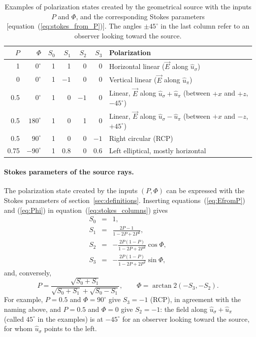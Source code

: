 \documentclass{iucr}
\begin{document}
\begin{table}
\centering
\caption{Examples of polarization states created by the geometrical source with the inputs $P$ and $\Phi$, and the corresponding Stokes parameters [equation~(\ref{eq:stokes_from_P})]. The angles $\pm45^\circ$ in the last column refer to an observer looking toward the source.}
\label{tab:source_polarization}
\small
\begin{tabular}{rr rrrr p{3.4cm}}
\hline
$P$ & $\Phi$ & $S_0$ & $S_1$ & $S_2$ & $S_3$ & Polarization \\
\hline
1    & $0^\circ$    & 1 & 1    & 0  & 0    & Horizontal linear ($\vec{E}$ along $\hat{u}_\sigma$) \\
0    & $0^\circ$    & 1 & $-1$ & 0  & 0    & Vertical linear ($\vec{E}$ along $\hat{u}_\pi$) \\
0.5  & $0^\circ$    & 1 & 0    & $-1$ & 0  & Linear, $\vec{E}$ along $\hat{u}_\sigma+\hat{u}_\pi$ (between $+x$ and $+z$, $-45^\circ$) \\
0.5  & $180^\circ$  & 1 & 0    & 1  & 0    & Linear, $\vec{E}$ along $\hat{u}_\sigma-\hat{u}_\pi$ (between $+x$ and $-z$, $+45^\circ$) \\
0.5  & $90^\circ$   & 1 & 0    & 0  & $-1$ & Right circular (RCP) \\
0.75 & $-90^\circ$  & 1 & 0.8  & 0  & 0.6  & Left elliptical, mostly horizontal \\
\hline
\end{tabular}
\end{table}

\paragraph{Stokes parameters of the source rays.}
The polarization state created by the inputs $(P,\Phi)$ can be expressed with the Stokes parameters of section~\ref{sec:definitions}. Inserting equations~(\ref{eq:EfromP}) and (\ref{eq:Phi}) in equation~(\ref{eq:stokes_columns}) gives
\begin{eqnarray}\label{eq:stokes_from_P}
    S_0 &=& 1, \nonumber \\
    S_1 &=& \frac{2P-1}{1-2P+2P^2}, \nonumber \\
    S_2 &=& -\frac{2P(1-P)}{1-2P+2P^2}\cos\Phi, \nonumber \\
    S_3 &=& -\frac{2P(1-P)}{1-2P+2P^2}\sin\Phi,
\end{eqnarray}
and, conversely,
\begin{equation}\label{eq:P_from_stokes}
    P = \frac{\sqrt{S_0+S_1}}{\sqrt{S_0+S_1}+\sqrt{S_0-S_1}}, \qquad
    \Phi = \arctan2(-S_3, -S_2).
\end{equation}
For example, $P=0.5$ and $\Phi=90^\circ$ give $S_3=-1$ (RCP), in agreement with the naming above, and $P=0.5$ and $\Phi=0$ give $S_2=-1$: the field along $\hat{u}_\sigma+\hat{u}_\pi$ (called $45^\circ$ in the examples) is at $-45^\circ$ for an observer looking toward the source, for whom $\hat{u}_\sigma$ points to the left.
\end{document}
